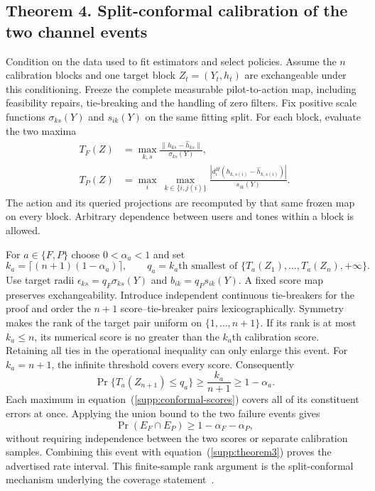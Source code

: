 \subsection{Theorem 4. Split-conformal calibration of the two channel events}
Condition on the data used to fit estimators and select policies. Assume the $n$ calibration blocks and one target block $Z_t=(Y_t,h_t)$ are exchangeable under this conditioning. Freeze the complete measurable pilot-to-action map, including feasibility repairs, tie-breaking and the handling of zero filters. Fix positive scale functions $\sigma_{ks}(Y)$ and $s_{ik}(Y)$ on the same fitting split. For each block, evaluate the two maxima
\begin{equation}
 \begin{aligned}
 T_F(Z)&=\max_{k,s}\frac{\|h_{ks}-\hat h_{ks}\|}{\sigma_{ks}(Y)},\\
 T_P(Z)&=\max_i\ \max_{k\in\{i,j(i)\}}
 \frac{|d_i^H(h_{k,s(i)}-\hat h_{k,s(i)})|}{s_{ik}(Y)}.
 \end{aligned}
 \label{supp:conformal-scores}
\end{equation}
The action and its queried projections are recomputed by that same frozen map on every block. Arbitrary dependence between users and tones within a block is allowed.

For $a\in\{F,P\}$ choose $0<\alpha_a<1$ and set
\begin{equation}
 k_a=\lceil(n+1)(1-\alpha_a)\rceil,\qquad
 q_a=\text{$k_a$th smallest of }\{T_a(Z_1),\ldots,T_a(Z_n),+\infty\}.
 \label{supp:conformal-rank}
\end{equation}
Use target radii $\epsilon_{ks}=q_F\sigma_{ks}(Y)$ and $b_{ik}=q_Ps_{ik}(Y)$. A fixed score map preserves exchangeability. Introduce independent continuous tie-breakers for the proof and order the $n+1$ score--tie-breaker pairs lexicographically. Symmetry makes the rank of the target pair uniform on $\{1,\ldots,n+1\}$. If its rank is at most $k_a\le n$, its numerical score is no greater than the $k_a$th calibration score. Retaining all ties in the operational inequality can only enlarge this event. For $k_a=n+1$, the infinite threshold covers every score. Consequently
\begin{equation}
 \Pr\{T_a(Z_{n+1})\le q_a\}\ge\frac{k_a}{n+1}\ge1-\alpha_a.
 \label{supp:single-coverage}
\end{equation}
Each maximum in equation~(\ref{supp:conformal-scores}) covers all of its constituent errors at once. Applying the union bound to the two failure events gives
\begin{equation}
 \Pr(E_F\cap E_P)\ge1-\alpha_F-\alpha_P,
 \label{supp:joint-coverage}
\end{equation}
without requiring independence between the two scores or separate calibration samples. Combining this event with equation~(\ref{supp:theorem3}) proves the advertised rate interval. This finite-sample rank argument is the split-conformal mechanism underlying the coverage statement~\cite{lei,johnstone}.

